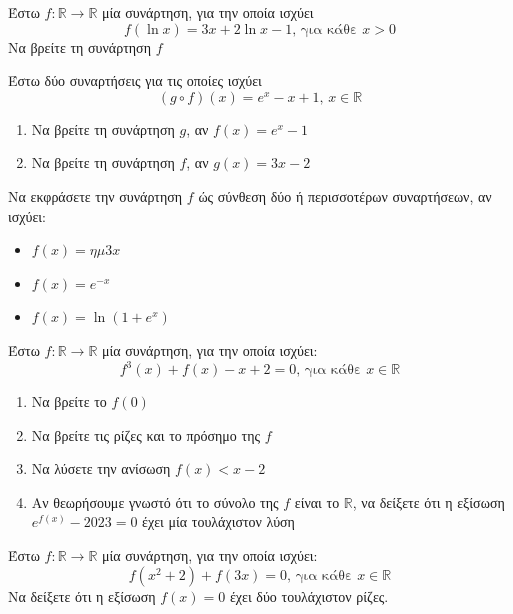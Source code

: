 \documentclass{presentation}
\begin{document}
\begin{askisi}
  Έστω $f:\mathbb{R}\to\mathbb{R}$ μία συνάρτηση, για την οποία ισχύει
  $$f(\ln x)=3x+2\ln x -1\text{, για κάθε } x>0$$
  Να βρείτε τη συνάρτηση $f$

\end{askisi}

\begin{askisi}
  Έστω δύο συναρτήσεις για τις οποίες ισχύει
  $$(g\circ f)(x)=e^x-x+1\text{, } x\in\mathbb{R}$$
  \begin{enumerate}
    \item<1-> Να βρείτε τη συνάρτηση $g$, αν $f(x)=e^x-1$
    \item<2-> Να βρείτε τη συνάρτηση $f$, αν $g(x)=3x-2$
  \end{enumerate}

\end{askisi}

\begin{askisi}
  Να εκφράσετε την συνάρτηση $f$ ώς σύνθεση δύο ή περισσοτέρων συναρτήσεων, αν ισχύει:
  \begin{itemize}
    \item $f(x)=ημ 3x$
    \item $f(x)=e^{-x}$
    \item $f(x)=\ln (1+e^x)$
  \end{itemize}

\end{askisi}

\begin{askisi}
  Έστω $f:\mathbb{R}\to\mathbb{R}$ μία συνάρτηση, για την οποία ισχύει:
  $$f^3(x)+f(x)-x+2=0\text{, για κάθε } x\in\mathbb{R}$$
  \begin{enumerate}
    \item<1-> Να βρείτε το $f(0)$
    \item<2-> Να βρείτε τις ρίζες και το πρόσημο της $f$
    \item<3-> Να λύσετε την ανίσωση $f(x)<x-2$
    \item<4-> Αν θεωρήσουμε γνωστό ότι το σύνολο της $f$ είναι το $\mathbb{R}$, να δείξετε ότι η εξίσωση $e^{f(x)}-2023=0$ έχει μία τουλάχιστον λύση
  \end{enumerate}

\end{askisi}

\begin{askisi}
  Έστω $f:\mathbb{R}\to\mathbb{R}$ μία συνάρτηση, για την οποία ισχύει:
  $$f(x^2+2)+f(3x)=0 \text{, για κάθε } x\in\mathbb{R}$$
  Να δείξετε ότι η εξίσωση $f(x)=0$ έχει δύο τουλάχιστον ρίζες.

\end{askisi}
\end{document}
